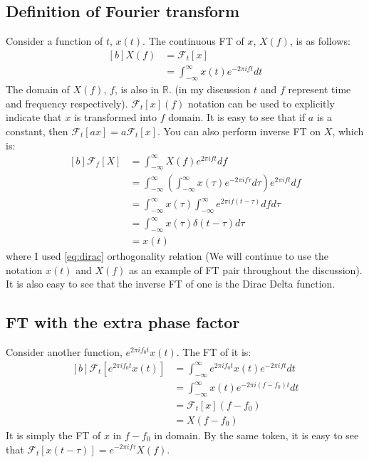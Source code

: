 \documentclass[letterpaper, 11pt]{article}
\newcommand{\fint}{\int_{-\infty}^{\infty}} %
\newcommand{\fourier}[2]{\mathcal{F}_{#1}[#2]} %
\newcommand{\ft}[3]{\fint #2 e^{-2\pi i#3#1} d#1} %
\newcommand{\ift}[3]{\fint #2 e^{2\pi i#1#3} d#1} %
\numberwithin{equation}{section}
\numberwithin{figure}{section}
\begin{document}
\subsection{Definition of Fourier transform}
Consider a function of \(t\), \(x(t)\). The continuous FT of \(x\), \(X(f)\), is as follows:
\begin{equation}
	\begin{aligned}[b]
		X(f)	&=\fourier{t}{x} \\
			&=\ft{t}{x(t)}{f}
	\end{aligned}
\end{equation}
The domain of \(X(f)\), \(f\), is also in \(\mathbb{R}\). (in my discussion \(t\) and \(f\) represent time and frequency respectively). \(\fourier{t}{x}(f)\) notation can be used to explicitly indicate that \(x\) is transformed into \(f\) domain. It is easy to see that if \(a\) is a constant, then \(\fourier{t}{ax} = a \fourier{t}{x}\). You can also perform inverse FT on \(X\), which is:
\begin{equation}
	\begin{aligned}[b]
		\fourier{f}{X}	&= \ift{f}{X(f)}{t} \\
				&= \ift{f}{\left ( \ft{\tau}{x(\tau)}{f}\right )}{t} \\
				&= \fint x(\tau) \fint e^{2\pi if(t - \tau)} df d\tau \\
				&= \fint x(\tau) \delta (t - \tau) d\tau \\
				&= x(t)
	\end{aligned}
\end{equation}
where I used \eqref{eq:dirac} orthogonality relation (We will continue to use the notation \(x(t)\) and \(X(f)\) as an example of FT pair throughout the discussion). It is also easy to see that the inverse FT of one is the Dirac Delta function.

\subsection{FT with the extra phase factor}
Consider another function, \(e^{2\pi i f_{0} t}x(t)\). The FT of it is:
\begin{equation}
	\begin{aligned}[b]
		\fourier{t}{e^{2\pi i f_{0} t}x(t)}
			&= \ft{t}{e^{2\pi i f_{0} t}x(t)}{f}\\
			&= \ft{t}{x(t)}{(f - f_{0})}\\
			&= \fourier{t}{x}(f - f_{0})\\
			&= X(f - f_{0})
	\end{aligned}
\end{equation}
It is simply the FT of \(x\) in \(f - f_{0}\) in domain. By the same token, it is easy to see that \(\fourier{t}{x(t - \tau)} = e^{-2\pi i f\tau}X(f)\).
\end{document}
